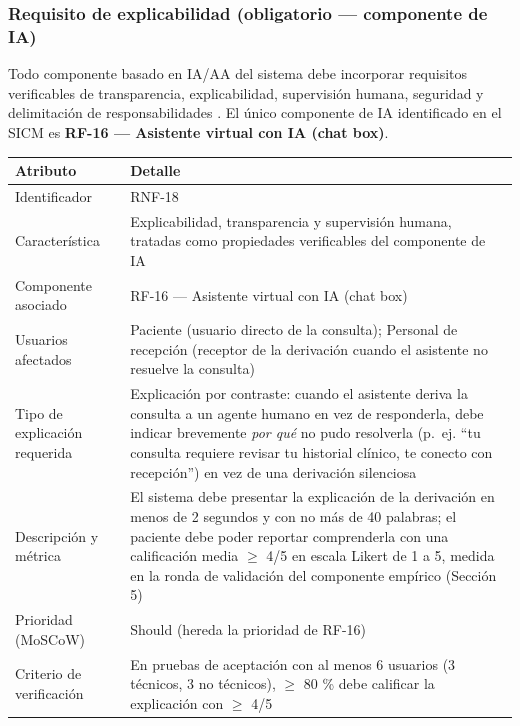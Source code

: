 \documentclass[11pt,a4paper]{article}
\begin{document}
	\subsubsection{ Requisito de explicabilidad (obligatorio --- componente de IA)}
	
	Todo componente basado en IA/AA del sistema debe incorporar requisitos verificables de transparencia, explicabilidad, supervisión humana, seguridad y delimitación de responsabilidades \cite{whoai2021,euaiact2024,fda2022,topol2019}. El único componente de IA identificado en el SICM es \textbf{RF-16 --- Asistente virtual con IA (chat box)}.
	
	\begin{longtable}{p{} p{}}
		
		\toprule
		\textbf{Atributo} & \textbf{Detalle} \\
		\midrule
		\endhead
		
		Identificador & RNF-18 \\
		Característica & Explicabilidad, transparencia y supervisión humana, tratadas como propiedades verificables del componente de IA \cite{whoai2021,euaiact2024} \\
		Componente asociado & RF-16 --- Asistente virtual con IA (chat box) \\
		Usuarios afectados & Paciente (usuario directo de la consulta); Personal de recepción (receptor de la derivación cuando el asistente no resuelve la consulta) \\
		Tipo de explicación requerida & Explicación por contraste: cuando el asistente deriva la consulta a un agente humano en vez de responderla, debe indicar brevemente \emph{por qué} no pudo resolverla (p.~ej. ``tu consulta requiere revisar tu historial clínico, te conecto con recepción'') en vez de una derivación silenciosa \\
		Descripción y métrica & El sistema debe presentar la explicación de la derivación en menos de 2 segundos y con no más de 40 palabras; el paciente debe poder reportar comprenderla con una calificación media \(\geq\) 4/5 en escala Likert de 1 a 5, medida en la ronda de validación del componente empírico (Sección 5) \\
		Prioridad (MoSCoW) & Should (hereda la prioridad de RF-16) \\
		Criterio de verificación & En pruebas de aceptación con al menos 6 usuarios (3 técnicos, 3 no técnicos), \(\geq\) 80 \% debe calificar la explicación con \(\geq\) 4/5 \\
		\bottomrule
	\end{longtable}
	
\end{document}
